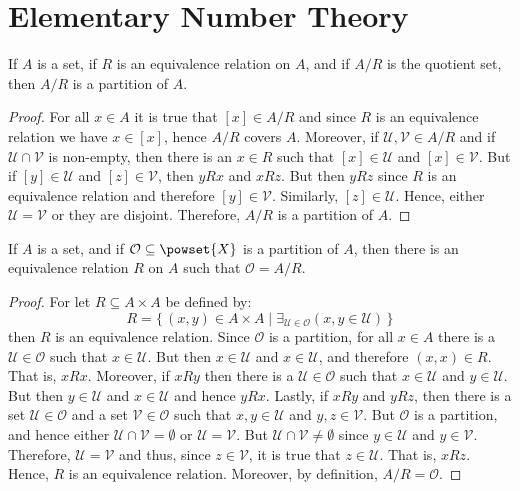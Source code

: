 \section{Elementary Number Theory}
    \begin{theorem}
        \label{thm:Equiv_Classes_Form_Partition}%
        If $A$ is a set, if $R$ is an equivalence relation on $A$, and
        if $A/R$ is the quotient set, then $A/R$ is a partition of $A$.
    \end{theorem}
    \begin{proof}
        For all $x\in{A}$ it is true that $[x]\in{A}/R$ and since $R$ is
        an equivalence relation we have $x\in[x]$, hence $A/R$ covers
        $A$. Moreover, if $\mathcal{U},\mathcal{V}\in{A}/R$ and if
        $\mathcal{U}\cap\mathcal{V}$ is non-empty, then there is an
        $x\in{R}$ such that $[x]\in\mathcal{U}$ and $[x]\in\mathcal{V}$.
        But if $[y]\in\mathcal{U}$ and $[z]\in\mathcal{V}$, then
        $yRx$ and $xRz$. But then $yRz$ since $R$ is an equivalence
        relation and therefore $[y]\in\mathcal{V}$. Similarly,
        $[z]\in\mathcal{U}$. Hence, either $\mathcal{U}=\mathcal{V}$ or
        they are disjoint. Therefore, $A/R$ is a partition of $A$.
    \end{proof}
    \begin{theorem}
        If $A$ is a set, and if $\mathcal{O}\subseteq\powset{X}$ is a
        partition of $A$, then there is an equivalence relation $R$ on
        $A$ such that $\mathcal{O}=A/R$.
    \end{theorem}
    \begin{proof}
        For let $R\subseteq{A}\times{A}$ be defined by:
        \begin{equation}
            R=\{\,(x,y)\in{A}\times{A}\;|\;
                \exists_{\mathcal{U}\in\mathcal{O}}
                (x,y\in\mathcal{U})\,\}
        \end{equation}
        then $R$ is an equivalence relation. Since $\mathcal{O}$ is a
        partition, for all $x\in{A}$ there is a
        $\mathcal{U}\in\mathcal{O}$ such that $x\in\mathcal{U}$. But
        then $x\in\mathcal{U}$ and $x\in\mathcal{U}$, and therefore
        $(x,x)\in{R}$. That is, $xRx$. Moreover, if $xRy$ then there is
        a $\mathcal{U}\in\mathcal{O}$ such that $x\in\mathcal{U}$ and
        $y\in\mathcal{U}$. But then $y\in\mathcal{U}$ and
        $x\in\mathcal{U}$ and hence $yRx$. Lastly, if $xRy$ and $yRz$,
        then there is a set $\mathcal{U}\in\mathcal{O}$ and a set
        $\mathcal{V}\in\mathcal{O}$ such that $x,y\in\mathcal{U}$ and
        $y,z\in\mathcal{V}$. But $\mathcal{O}$ is a partition, and hence
        either $\mathcal{U}\cap\mathcal{V}=\emptyset$ or
        $\mathcal{U}=\mathcal{V}$. But
        $\mathcal{U}\cap\mathcal{V}\ne\emptyset$ since $y\in\mathcal{U}$
        and $y\in\mathcal{V}$. Therefore, $\mathcal{U}=\mathcal{V}$ and
        thus, since $z\in\mathcal{V}$, it is true that
        $z\in\mathcal{U}$. That is, $xRz$. Hence, $R$ is an equivalence
        relation. Moreover, by definition, $A/R=\mathcal{O}$.
    \end{proof}
